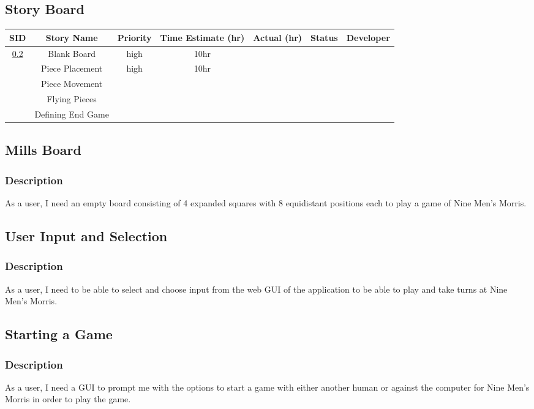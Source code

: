 \documentclass[11pt]{article}
\begin{document}
\subsection{Story Board}
\label{sec:orgc04e444}
\begin{center}
\begin{tabular}{|c|c|c|c|c|c|c|}
SID & Story Name & Priority & Time Estimate (hr) & Actual (hr) & Status & Developer\\
\hline
\ref{sec:org9a752e5} & Blank Board & high & 10hr &  &  & \\
 & Piece Placement & high & 10hr &  &  & \\
 & Piece Movement &  &  &  &  & \\
 & Flying Pieces &  &  &  &  & \\
 & Defining End Game &  &  &  &  & \\
\end{tabular}
\end{center}
\subsection{Mills Board}
\label{sec:org9a752e5}
\subsubsection*{Description}
\label{sec:org55e6496}
As a user, I need an empty board consisting of 4 expanded squares with 8 equidistant positions
each to play a game of Nine Men's Morris.
\subsection{User Input and Selection}
\label{sec:org20f49a2}
\subsubsection*{Description}
\label{sec:orgfa7cd0e}
As a user, I need to be able to select and choose input from the web GUI of the application to
be able to play and take turns at Nine Men's Morris.
\subsection{Starting a Game}
\label{sec:orgdf7eec8}
\subsubsection*{Description}
\label{sec:org02d9caf}
As a user, I need a GUI to prompt me with the options to start a game with either another human
or against the computer for Nine Men's Morris in order to play the game.
\end{document}
